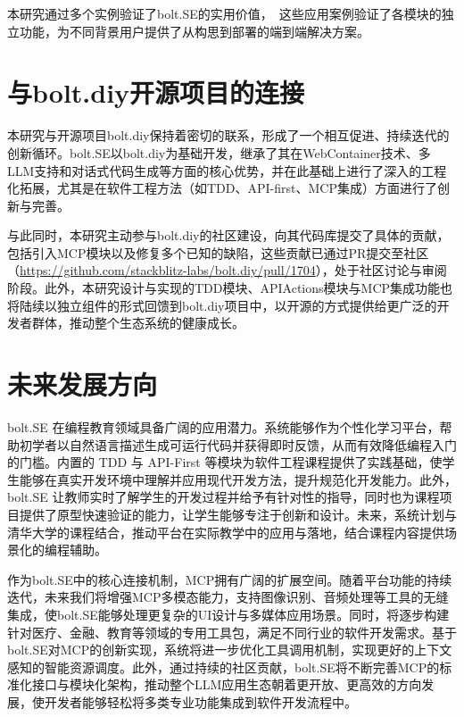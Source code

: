 本研究通过多个实例验证了bolt.SE的实用价值，　这些应用案例验证了各模块的独立功能，为不同背景用户提供了从构思到部署的端到端解决方案。

\section{与bolt.diy开源项目的连接}

本研究与开源项目bolt.diy保持着密切的联系，形成了一个相互促进、持续迭代的创新循环。bolt.SE以bolt.diy为基础开发，继承了其在WebContainer技术、多LLM支持和对话式代码生成等方面的核心优势，并在此基础上进行了深入的工程化拓展，尤其是在软件工程方法（如TDD、API-first、MCP集成）方面进行了创新与完善。

与此同时，本研究主动参与bolt.diy的社区建设，向其代码库提交了具体的贡献，包括引入MCP模块以及修复多个已知的缺陷，这些贡献已通过PR提交至社区（\href{https://github.com/stackblitz-labs/bolt.diy/pull/1704}{https://github.com/stackblitz-labs/bolt.diy/pull/1704}），处于社区讨论与审阅阶段。此外，本研究设计与实现的TDD模块、APIActions模块与MCP集成功能也将陆续以独立组件的形式回馈到bolt.diy项目中，以开源的方式提供给更广泛的开发者群体，推动整个生态系统的健康成长。

\section{未来发展方向}

bolt.SE 在编程教育领域具备广阔的应用潜力。系统能够作为个性化学习平台，帮助初学者以自然语言描述生成可运行代码并获得即时反馈，从而有效降低编程入门的门槛。内置的 TDD 与 API-First 等模块为软件工程课程提供了实践基础，使学生能够在真实开发环境中理解并应用现代开发方法，提升规范化开发能力。此外，bolt.SE 让教师实时了解学生的开发过程并给予有针对性的指导，同时也为课程项目提供了原型快速验证的能力，让学生能够专注于创新和设计。未来，系统计划与清华大学的课程结合，推动平台在实际教学中的应用与落地，结合课程内容提供场景化的编程辅助。

作为bolt.SE中的核心连接机制，MCP拥有广阔的扩展空间。随着平台功能的持续迭代，未来我们将增强MCP多模态能力，支持图像识别、音频处理等工具的无缝集成，使bolt.SE能够处理更复杂的UI设计与多媒体应用场景。同时，将逐步构建针对医疗、金融、教育等领域的专用工具包，满足不同行业的软件开发需求。基于bolt.SE对MCP的创新实现，系统将进一步优化工具调用机制，实现更好的上下文感知的智能资源调度。此外，通过持续的社区贡献，bolt.SE将不断完善MCP的标准化接口与模块化架构，推动整个LLM应用生态朝着更开放、更高效的方向发展，使开发者能够轻松将多类专业功能集成到软件开发流程中。

